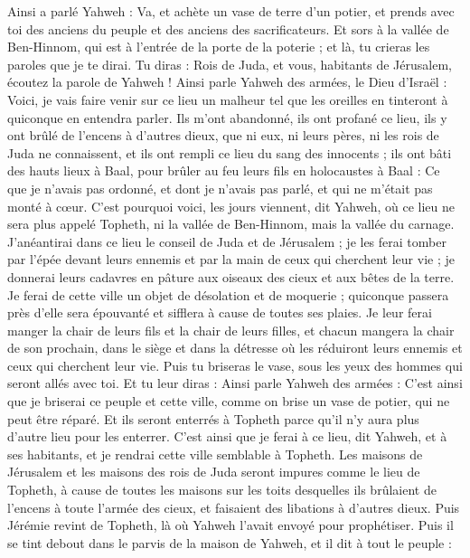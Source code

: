 \begin{multicols}{2}
\VerseOne{}Ainsi a parlé Yahweh : Va, et achète un vase de terre d'un potier, et prends avec toi des anciens du peuple et des anciens des sacrificateurs.
Et sors à la vallée de Ben-Hinnom, qui est à l'entrée de la porte de la poterie ; et là, tu crieras les paroles que je te dirai.
Tu diras : Rois de Juda, et vous, habitants de Jérusalem, écoutez la parole de Yahweh ! Ainsi parle Yahweh des armées, le Dieu d'Israël : Voici, je vais faire venir sur ce lieu un malheur tel que les oreilles en tinteront à quiconque en entendra parler.
Ils m'ont abandonné, ils ont profané ce lieu, ils y ont brûlé de l'encens à d'autres dieux, que ni eux, ni leurs pères, ni les rois de Juda ne connaissent, et ils ont rempli ce lieu du sang des innocents ;
ils ont bâti des hauts lieux à Baal, pour brûler au feu leurs fils en holocaustes à Baal : Ce que je n'avais pas ordonné, et dont je n'avais pas parlé, et qui ne m'était pas monté à cœur.
C'est pourquoi voici, les jours viennent, dit Yahweh, où ce lieu ne sera plus appelé Topheth, ni la vallée de Ben-Hinnom, mais la vallée du carnage.
J'anéantirai dans ce lieu le conseil de Juda et de Jérusalem ; je les ferai tomber par l'épée devant leurs ennemis et par la main de ceux qui cherchent leur vie ; je donnerai leurs cadavres en pâture aux oiseaux des cieux et aux bêtes de la terre.
Je ferai de cette ville un objet de désolation et de moquerie ; quiconque passera près d'elle sera épouvanté et sifflera à cause de toutes ses plaies.
Je leur ferai manger la chair de leurs fils et la chair de leurs filles, et chacun mangera la chair de son prochain, dans le siège et dans la détresse où les réduiront leurs ennemis et ceux qui cherchent leur vie.
Puis tu briseras le vase, sous les yeux des hommes qui seront allés avec toi.
Et tu leur diras : Ainsi parle Yahweh des armées : C'est ainsi que je briserai ce peuple et cette ville, comme on brise un vase de potier, qui ne peut être réparé. Et ils seront enterrés à Topheth parce qu'il n'y aura plus d'autre lieu pour les enterrer.
C'est ainsi que je ferai à ce lieu, dit Yahweh, et à ses habitants, et je rendrai cette ville semblable à Topheth.
Les maisons de Jérusalem et les maisons des rois de Juda seront impures comme le lieu de Topheth, à cause de toutes les maisons sur les toits desquelles ils brûlaient de l'encens à toute l'armée des cieux, et faisaient des libations à d'autres dieux.
Puis Jérémie revint de Topheth, là où Yahweh l'avait envoyé pour prophétiser. Puis il se tint debout dans le parvis de la maison de Yahweh, et il dit à tout le peuple :

\end{multicols}
